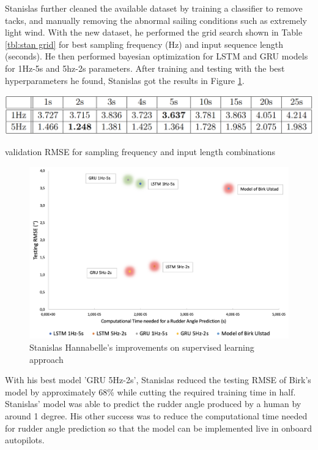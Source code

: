 \documentclass[12pt,twoside]{report}
\begin{document}
Stanislas further cleaned the available dataset by training a classifier to remove tacks, and manually removing the abnormal sailing conditions such as extremely light wind. With the new dataset, he performed the grid search shown in Table \ref{tbl:stan grid} for best sampling frequency (Hz) and input sequence length (seconds). He then performed bayesian optimization for LSTM and GRU models for 1Hz-5s and 5hz-2s parameters. After training and testing with the best hyperparameters he found, Stanislas got the results in Figure \ref{fig:stan results}.

\begin{table}[h]
\centering
\includegraphics[width=\linewidth]{figures/stan grid search.png}
\caption{validation RMSE for sampling frequency and input length combinations}
\label{tbl:stan grid}
\end{table}

\begin{figure}[h]
\centering
\includegraphics[width = 0.9\hsize]{figures/stan results.png}
\caption{Stanislas Hannabelle's improvements on supervised learning approach}
\label{fig:stan results}
\end{figure}

With his best model 'GRU 5Hz-2s', Stanislas reduced the testing RMSE of Birk's model by approximately 68\% while cutting the required training time in half. Stanislas' model was able to predict the rudder angle produced by a human by around 1 degree. His other success was to reduce the computational time needed for rudder angle prediction so that the model can be implemented live in onboard autopilots.
\end{document}
